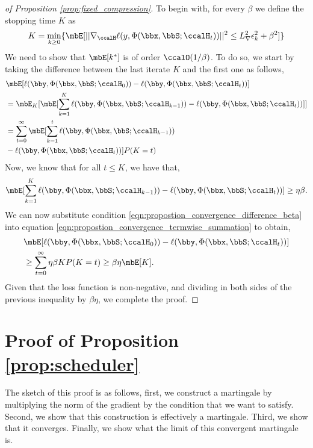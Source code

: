 \begin{proof}[of Proposition \ref{prop:fixed_compression}]
	To begin with, for every $\beta$ we define the stopping time $K$ as
	\begin{align}
		K=\min_{k\geq 0} \{\mbE[||\nabla_\ccalH \ell(y,\Phi(\bbx,\bbS;\ccalH_t)) ||^2\leq \lipGrad^2\epsilon_k^2 +\beta^2]\}
	\end{align}
	We need to show that $\mbE[k^*]$ is of order $\ccalO(1/\beta)$. To do so, we start by taking the difference between the last iterate $K$ and the first one as follows, 
	\begin{align}
		&\mbE[\ell(\bby,\Phi(\bbx,\bbS;\ccalH_0))-\ell(\bby,\Phi(\bbx,\bbS;\ccalH_t))]\\
		&=\mbE_{K}[\mbE[\sum_{k=1}^K\ell(\bby,\Phi(\bbx,\bbS;\ccalH_{k-1}))-\ell(\bby,\Phi(\bbx,\bbS;\ccalH_t)) ]]\\
		&=\sum_{t=0}^\infty\mbE[\sum_{k=1}^t\ell(\bby,\Phi(\bbx,\bbS;\ccalH_{k-1}))\nonumber\\
  &-\ell(\bby,\Phi(\bbx,\bbS;\ccalH_t)) ]P(K=t)\label{eqn:propostion_convergence_termwise_summation}
	\end{align}
	Now, we know that for all $t\leq K$, we have that, 
	\begin{align}
		\mbE[\sum_{k=1}^K\ell(\bby,\Phi(\bbx,\bbS;\ccalH_{k-1}))-\ell(\bby,\Phi(\bbx,\bbS;\ccalH_t)) ]\geq \eta \beta .\label{eqn:propostion_convergence_difference_beta}
	\end{align}
	We can now substitute condition \ref{eqn:propostion_convergence_difference_beta} into equation \ref{eqn:propostion_convergence_termwise_summation} to obtain, 
	\begin{align}
		&\mbE[\ell(\bby,\Phi(\bbx,\bbS;\ccalH_0))-\ell(\bby,\Phi(\bbx,\bbS;\ccalH_t))]\\
		&\geq\sum_{t=0}^\infty \eta \beta K P(K=t)\geq\beta \eta \mbE[K].
	\end{align}
	Given that the loss function is non-negative, and dividing in both sides of the previous inequality by $\beta \eta$, we complete the proof.
	
\end{proof}



\section{Proof of Proposition \ref{prop:scheduler}}\label{appendix:proof_scheduler}
The sketch of this proof is as follows, first, we construct a martingale by multiplying the norm of the gradient by the condition that we want to satisfy. Second, we show that this construction is effectively a martingale. Third, we show that it converges. Finally, we show what the limit of this convergent martingale is.


